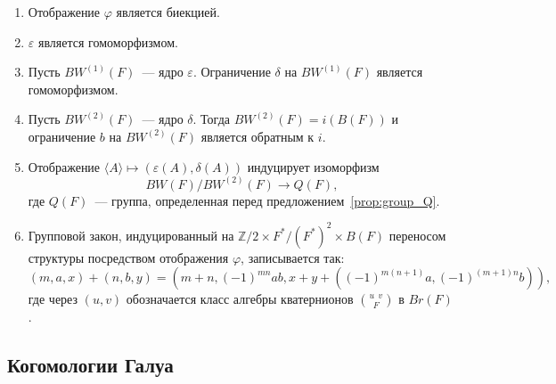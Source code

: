 \documentclass[a4paper,oneside,12pt]{article}
\theoremstyle{plain} { \swapnumbers
\newtheorem{theorem}{Теорема}[subsection]
\newtheorem{corollary}[theorem]{Следствие}
\newtheorem{lemma}[theorem]{Лемма}
\newtheorem{proposition}[theorem]{Утверждение}
\newtheorem{claim}[theorem]{Факт}
}
\theoremstyle{definition} { \swapnumbers
\newtheorem{definition}[theorem]{Определение}
\newtheorem{notation}[theorem]{Обозначение}
\newtheorem{remark}[theorem]{Замечание}
\newtheorem{remarks}[theorem]{Замечания}
\newtheorem{example}[theorem]{Пример}
\newtheorem{examples}[theorem]{Примеры}
\newtheorem{sssection}[theorem]{}
}
\def\ph{\varphi}
\def\la{\langle}
\def\ra{\rangle}
\def\quaternion#1#2#3{\binom{{#1}\:\:{#2}}{#3}}
\begin{document}
\begin{theorem}\label{thm:BW}
\begin{enumerate}
\item Отображение $\ph$ является биекцией.
\item $\varepsilon$ является гомоморфизмом.
\item Пусть $BW^{(1)}(F)$~--- ядро $\varepsilon$. Ограничение
$\delta$ на $BW^{(1)}(F)$ является гомоморфизмом.
\item Пусть $BW^{(2)}(F)$~--- ядро $\delta$. Тогда
$BW^{(2)}(F)=i(B(F))$ и ограничение $b$ на $BW^{(2)}(F)$
является обратным к $i$.
\item Отображение $\la A\ra\mapsto(\varepsilon(A),\delta(A))$
индуцирует изоморфизм $$BW(F)/BW^{(2)}(F)\to Q(F),$$
где $Q(F)$~--- группа, определенная перед предложением~\ref{prop:group_Q}.
\item Групповой закон, индуцированный на $\mathbb Z/2\times F^*/(F^*)^2\times B(F)$
переносом структуры посредством отображения $\ph$, записывается так:
$$
(m,a,x)+(n,b,y)=(m+n,(-1)^{mn}ab,x+y+((-1)^{m(n+1)}a,(-1)^{(m+1)n}b)),
$$
где через $(u,v)$ обозначается класс алгебры кватернионов $\quaternion{u}{v}{F}$ в $Br(F)$.
\end{enumerate}
\end{theorem}


\subsection{Когомологии Галуа}
\end{document}
